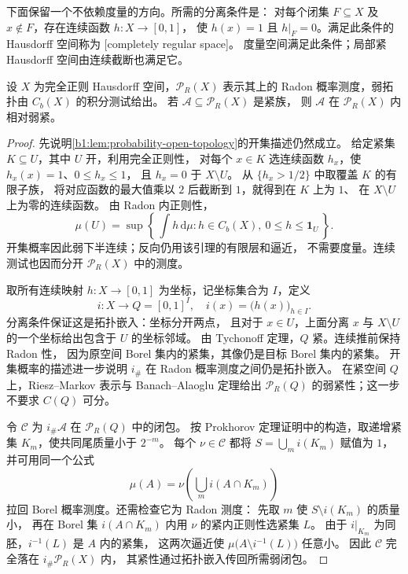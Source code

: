 \ProseParagraphBreak

下面保留一个不依赖度量的方向。所需的分离条件是：
对每个闭集 \(F\subseteq X\) 及 \(x\notin F\)，存在连续函数 \(h:X\rightarrow[0,1]\)，
使 \(h(x)=1\) 且 \(h|_F=0\)。满足此条件的 Hausdorff 空间称为%
[completely regular space]。
度量空间满足此条件；局部紧 Hausdorff 空间由连续截断也满足它。

\begin{proposition}\label{b1:prop:radon-tight-relative-compact}
设 \(X\) 为完全正则 Hausdorff 空间，\(\mathcal P_R(X)\) 表示其上的 Radon 概率测度，弱拓扑由 \(C_b(X)\) 的积分测试给出。
若 \(\mathcal A\subseteq\mathcal P_R(X)\) 是紧族，
则 \(\mathcal A\) 在 \(\mathcal P_R(X)\) 内相对弱紧。
\end{proposition}
\begin{proof}
先说明\cref{b1:lem:probability-open-topology}的开集描述仍然成立。
给定紧集 \(K\subseteq U\)，其中 \(U\) 开，利用完全正则性，
对每个 \(x\in K\) 选连续函数 \(h_x\)，使 \(h_x(x)=1\)、\(0\leq h_x\leq1\)，
且 \(h_x=0\) 于 \(X\setminus U\)。
从 \(\{h_x>1/2\}\) 中取覆盖 \(K\) 的有限子族，
将对应函数的最大值乘以 \(2\) 后截断到 \(1\)，就得到在 \(K\) 上为 \(1\)、
在 \(X\setminus U\) 上为零的连续函数。
由 Radon 内正则性，
\[
 \mu(U)=\sup\left\{\,\int h\,\mathrm{d}\mu:
       h\in C_b(X),\ 0\leq h\leq\mathbf1_U\,\right\}.
\]
开集概率因此弱下半连续；反向仍用该引理的有限层和逼近，
不需要度量。连续测试也因而分开 \(\mathcal P_R(X)\) 中的测度。

取所有连续映射 \(h:X\rightarrow[0,1]\) 为坐标，记坐标集合为 \(I\)，定义
\[
 i:X\longrightarrow Q=[0,1]^I,\quad i(x)=\bigl(h(x)\bigr)_{h\in I}.
\]
分离条件保证这是拓扑嵌入：坐标分开两点，
且对于 \(x\in U\)，上面分离 \(x\) 与 \(X\setminus U\) 的一个坐标给出包含于 \(U\) 的坐标邻域。
由 Tychonoff 定理，\(Q\) 紧。连续推前保持 Radon 性，
因为原空间 Borel 集内的紧集，其像仍是目标 Borel 集内的紧集。
开集概率的描述进一步说明 \(i_\#\) 在 Radon 概率测度之间仍是拓扑嵌入。
在紧空间 \(Q\) 上，Riesz--Markov 表示与 Banach--Alaoglu 定理给出
\(\mathcal P_R(Q)\) 的弱紧性；这一步不要求 \(C(Q)\) 可分。

令 \(\mathcal C\) 为 \(i_\#\mathcal A\) 在 \(\mathcal P_R(Q)\) 中的闭包。
按 Prokhorov 定理证明中的构造，取递增紧集 \(K_m\)，使共同尾质量小于 \(2^{-m}\)。
每个 \(\nu\in\mathcal C\) 都将 \(S=\bigcup_mi(K_m)\) 赋值为 \(1\)，
并可用同一个公式
\[
 \mu(A)=\nu\left(\bigcup_m i(A\cap K_m)\right)
\]
拉回 Borel 概率测度。还需检查它为 Radon 测度：
先取 \(m\) 使 \(S\setminus i(K_m)\) 的质量小，
再在 Borel 集 \(i(A\cap K_m)\) 内用 \(\nu\) 的紧内正则性选紧集 \(L\)。
由于 \(i|_{K_m}\) 为同胚，\(i^{-1}(L)\) 是 \(A\) 内的紧集，
这两次逼近使 \(\mu\bigl(A\setminus i^{-1}(L)\bigr)\) 任意小。
因此 \(\mathcal C\) 完全落在 \(i_\#\mathcal P_R(X)\) 内，
其紧性通过拓扑嵌入传回所需弱闭包。
\end{proof}

